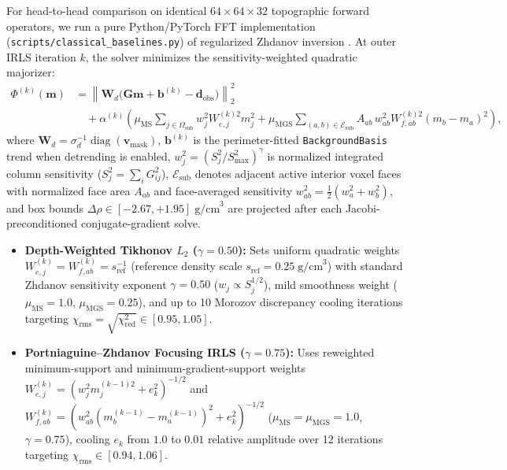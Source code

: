 \documentclass[11pt,a4paper]{article}
\begin{document}
For head-to-head comparison on identical $64\times 64\times 32$ topographic forward operators, we run a pure Python/\allowbreak PyTorch FFT implementation (\texttt{scripts/\allowbreak classical\_baselines.py}) of regularized Zhdanov inversion \citep{tikhonov1977,last1983,li1998,portniaguine1999,zhdanov2002}. At outer IRLS iteration $k$, the solver minimizes the sensitivity-weighted quadratic majorizer:
\begin{equation}
\begin{aligned}
  \Phi^{(k)}(\mathbf{m}) &= \left\|\mathbf{W}_d \bigl(\mathbf{G}\mathbf{m} + \mathbf{b}^{(k)} - \mathbf{d}_{\mathrm{obs}}\bigr)\right\|_2^2 \\
  &\quad + \alpha^{(k)} \left(
    \mu_{\mathrm{MS}} \sum_{j \in \Omega_{\mathrm{sub}}} w_j^2 W_{e,j}^{(k)2} m_j^2
    + \mu_{\mathrm{MGS}} \sum_{(a,b) \in \mathcal{E}_{\mathrm{sub}}} A_{ab}\, w_{ab}^2 W_{f,ab}^{(k)2} (m_b - m_a)^2
  \right),
\end{aligned}
  \label{eq:focusing_obj}
\end{equation}
where $\mathbf{W}_d = \sigma_d^{-1}\operatorname{diag}(\mathbf{v}_{\mathrm{mask}})$, $\mathbf{b}^{(k)}$ is the perimeter-fitted \texttt{BackgroundBasis} trend when detrending is enabled, $w_j^2 = (S_j^2 / S_{\max}^2)^\gamma$ is normalized integrated column sensitivity ($S_j^2 = \sum_i G_{ij}^2$), $\mathcal{E}_{\mathrm{sub}}$ denotes adjacent active interior voxel faces with normalized face area $A_{ab}$ and face-averaged sensitivity $w_{ab}^2 = \frac{1}{2}(w_a^2 + w_b^2)$, and box bounds $\Delta\rho \in [-2.67, +1.95]\;\text{g/cm}^3$ are projected after each Jacobi-preconditioned conjugate-gradient solve.
\begin{itemize}[leftmargin=1.4em,itemsep=0.2em]
  \item \textbf{Depth-Weighted Tikhonov $L_2$ ($\gamma = 0.50$):} Sets uniform quadratic weights $W_{e,j}^{(k)} = W_{f,ab}^{(k)} = s_{\mathrm{ref}}^{-1}$ (reference density scale $s_{\mathrm{ref}} = 0.25\;\text{g/cm}^3$) with standard Zhdanov sensitivity exponent $\gamma = 0.50$ ($w_j \propto S_j^{1/2}$), mild smoothness weight ($\mu_{\mathrm{MS}}=1.0$, $\mu_{\mathrm{MGS}}=0.25$), and up to 10 Morozov discrepancy cooling iterations targeting $\chi_{\mathrm{rms}} = \sqrt{\chi^2_{\mathrm{red}}} \in [0.95, 1.05]$.
  \item \textbf{Portniaguine--Zhdanov Focusing IRLS ($\gamma = 0.75$):} Uses reweighted minimum-support and minimum-gradient-support weights $W_{e,j}^{(k)} = (w_j^2 m_j^{(k-1)2} + e_k^2)^{-1/2}$ and $W_{f,ab}^{(k)} = (w_{ab}^2 (m_b^{(k-1)} - m_a^{(k-1)})^2 + e_k^2)^{-1/2}$ ($\mu_{\mathrm{MS}}=\mu_{\mathrm{MGS}}=1.0$, $\gamma = 0.75$), cooling $e_k$ from $1.0$ to $0.01$ relative amplitude over 12 iterations targeting $\chi_{\mathrm{rms}} \in [0.94, 1.06]$.
\end{itemize}
\end{document}
